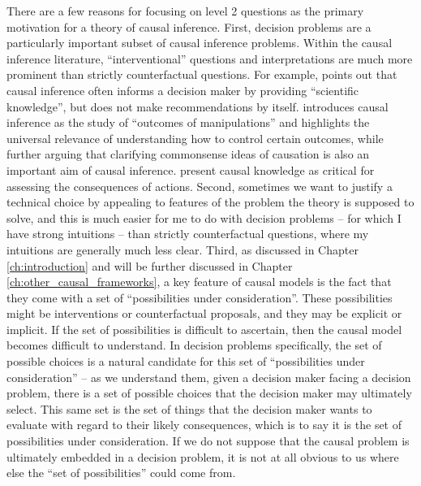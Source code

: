 There are a few reasons for focusing on level 2 questions as the primary motivation for a theory of causal inference. First, decision problems are a particularly important subset of causal inference problems. Within the causal inference literature, ``interventional'' questions and interpretations are much more prominent than strictly counterfactual questions. For example, \citet{rubin_causal_2005} points out that causal inference often informs a decision maker by providing ``scientific knowledge'', but does not make recommendations by itself. \citep{imbens_causal_2015} introduces causal inference as the study of ``outcomes of manipulations'' and \citep{spirtes_causation_1993} highlights the universal relevance of understanding how to control certain outcomes, while further arguing that clarifying commonsense ideas of causation is also an important aim of causal inference. \citet{hernan_whatif_2020} present causal knowledge as critical for assessing the consequences of actions. Second, sometimes we want to justify a technical choice by appealing to features of the problem the theory is supposed to solve, and this is much easier for me to do with decision problems -- for which I have strong intuitions -- than strictly counterfactual questions, where my intuitions are generally much less clear. Third, as discussed in Chapter \ref{ch:introduction} and will be further discussed in Chapter \ref{ch:other_causal_frameworks}, a key feature of causal models is the fact that they come with a set of ``possibilities under consideration''. These possibilities might be interventions or counterfactual proposals, and they may be explicit or implicit. If the set of possibilities is difficult to ascertain, then the causal model becomes difficult to understand. In decision problems specifically, the set of possible choices is a natural candidate for this set of ``possibilities under consideration'' -- as we understand them, given a decision maker facing a decision problem, there is a set of possible choices that the decision maker may ultimately select. This same set is the set of things that the decision maker wants to evaluate with regard to their likely consequences, which is to say it is the set of possibilities under consideration. If we do not suppose that the causal problem is ultimately embedded in a decision problem, it is not at all obvious to us where else the ``set of possibilities'' could come from.

